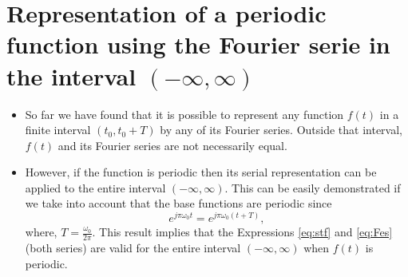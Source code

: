 \begin{comment}
\section{Relaci\'on entre las series exponencial y trigonom\'etrica de
  Fourier}
\begin{itemize}
\item Ambas series son dos formas diferentes de expresar la misma
  serie. De hecho se pueden obtener los coeficientes de una de las
  series a partir de los de la otra.
\item Si tomamos que
  $$
  \begin{array}{l}
    a_0 = F_0\\
    a_n = F_{n}+F_{-n}\\
    b_n = j(F_{n}-F_{-n})
  \end{array}
  $$
  se deduce que
  \begin{equation}
    F_n = \frac{1}{2}(a_n-jb_n).
  \end{equation}
  Por lo que es posible pasar de unos coeficientes a otros utilizando
  estas expresiones.
\end{itemize}
\end{comment}

\section{Representation of a periodic function using the Fourier serie in the interval $(-\infty, \infty)$}
\begin{itemize}
\item So far we have found that it is possible to represent any
  function $f(t)$ in a finite interval $(t_0, t_0+T)$ by any of its
  Fourier series. Outside that interval, $f(t)$ and its Fourier series
  are not necessarily equal.
\item However, if the function is periodic then its serial
  representation can be applied to the entire interval $(-\infty,
  \infty)$. This can be easily demonstrated if we take into account
  that the base functions are periodic since
  \begin{equation*}
    e^{j\pi \omega_0t} = e^{j\pi \omega_0(t+T)},
  \end{equation*}
  where, $T=\frac{\omega_0}{2\pi}$. This result implies that the
  Expressions \ref{eq:stf} and \ref{eq:Fes} (both series) are valid
  for the entire interval $(-\infty, \infty)$ when $f(t)$ is periodic.
\end{itemize}

